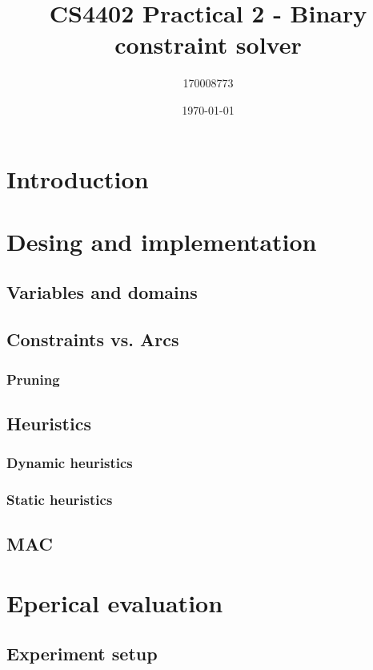 \documentclass[british]{article}
\title{CS4402 Practical 2 - Binary constraint solver}
\author{170008773}
\date{\today}
\begin{document}
\maketitle

\section{Introduction}

\section{Desing and implementation}


\subsection{Variables and domains}

\subsection{Constraints vs. Arcs}

\subsubsection{Pruning}

\subsection{Heuristics}
\subsubsection{Dynamic heuristics}

\subsubsection{Static heuristics}

\subsection{MAC}


\section{Eperical evaluation}

\subsection{Experiment setup}
\end{document}
